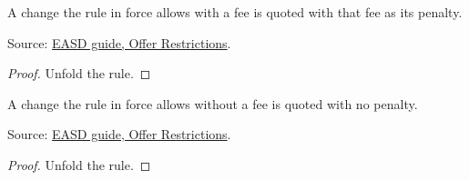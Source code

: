 \begin{theorem}
  \label{thm:offers-change-fee}
  A change the rule in force allows with a fee is quoted with that fee as
  its penalty.

  Source: \href{https://standards.atlassian.net/wiki/spaces/EASD/pages/574259692/Offer+Restrictions}{EASD guide, Offer Restrictions}.
\end{theorem}
\begin{proof}
  Unfold the rule.
\end{proof}

\begin{theorem}
  \label{thm:offers-change-no-fee}
  A change the rule in force allows without a fee is quoted with no
  penalty.

  Source: \href{https://standards.atlassian.net/wiki/spaces/EASD/pages/574259692/Offer+Restrictions}{EASD guide, Offer Restrictions}.
\end{theorem}
\begin{proof}
  Unfold the rule.
\end{proof}


